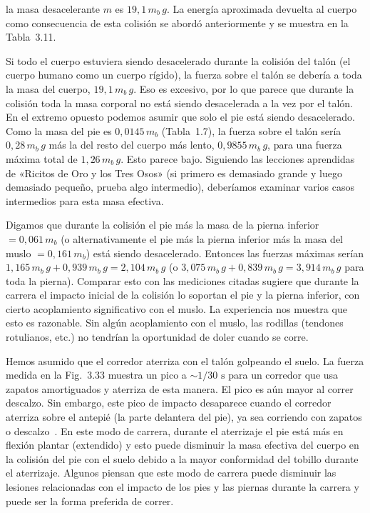 \documentclass[12pt]{book}
\begin{document}
la masa desacelerante $m$ es $19{,}1\,m_b\,g$. La energía aproximada devuelta al cuerpo como consecuencia de esta colisión se abordó anteriormente y se muestra en la Tabla~3.11.

Si todo el cuerpo estuviera siendo desacelerado durante la colisión del talón (el cuerpo humano como un cuerpo rígido), la fuerza sobre el talón se debería a toda la masa del cuerpo, $19{,}1\,m_b\,g$. Eso es excesivo, por lo que parece que durante la colisión toda la masa corporal no está siendo desacelerada a la vez por el talón. En el extremo opuesto podemos asumir que solo el pie está siendo desacelerado. Como la masa del pie es $0{,}0145\,m_b$ (Tabla~1.7), la fuerza sobre el talón sería $0{,}28\,m_b\,g$ más la del resto del cuerpo más lento, $0{,}9855\,m_b\,g$, para una fuerza máxima total de $1{,}26\,m_b\,g$. Esto parece bajo. Siguiendo las lecciones aprendidas de «Ricitos de Oro y los Tres Osos» (si primero es demasiado grande y luego demasiado pequeño, prueba algo intermedio), deberíamos examinar varios casos intermedios para esta masa efectiva.

Digamos que durante la colisión el pie más la masa de la pierna inferior $= 0{,}061\,m_b$ (o alternativamente el pie más la pierna inferior más la masa del muslo $= 0{,}161\,m_b$) está siendo desacelerado. Entonces las fuerzas máximas serían $1{,}165\,m_b\,g + 0{,}939\,m_b\,g = 2{,}104\,m_b\,g$ (o $3{,}075\,m_b\,g + 0{,}839\,m_b\,g = 3{,}914\,m_b\,g$ para toda la pierna). Comparar esto con las mediciones citadas sugiere que durante la carrera el impacto inicial de la colisión lo soportan el pie y la pierna inferior, con cierto acoplamiento significativo con el muslo. La experiencia nos muestra que esto es razonable. Sin algún acoplamiento con el muslo, las rodillas (tendones rotulianos, etc.) no tendrían la oportunidad de doler cuando se corre.

Hemos asumido que el corredor aterriza con el talón golpeando el suelo. La fuerza medida en la Fig.~3.33 muestra un pico a $\sim 1/30\text{ s}$ para un corredor que usa zapatos amortiguados y aterriza de esta manera. El pico es aún mayor al correr descalzo. Sin embargo, este pico de impacto desaparece cuando el corredor aterriza sobre el antepié (la parte delantera del pie), ya sea corriendo con zapatos o descalzo~\cite{ref85,ref87}. En este modo de carrera, durante el aterrizaje el pie está más en flexión plantar (extendido) y esto puede disminuir la masa efectiva del cuerpo en la colisión del pie con el suelo debido a la mayor conformidad del tobillo durante el aterrizaje. Algunos piensan que este modo de carrera puede disminuir las lesiones relacionadas con el impacto de los pies y las piernas durante la carrera y puede ser la forma preferida de correr.
\end{document}
